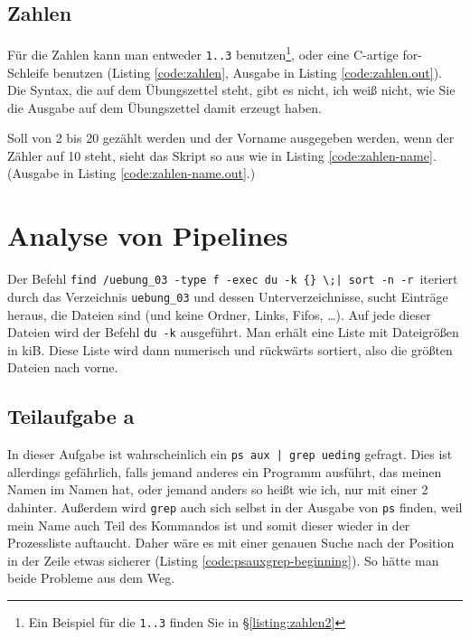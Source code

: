 {\subsection{Zahlen}

Für die Zahlen kann man entweder \texttt{{1..3}} benutzen\footnote{Ein Beispiel für die \texttt{{1..3}} finden Sie in §\ref{listing:zahlen2}}, oder eine C-artige for-Schleife benutzen (Listing \ref{code:zahlen}, Ausgabe in Listing \ref{code:zahlen.out}). Die Syntax, die auf dem Übungszettel steht, gibt es nicht, ich weiß nicht, wie Sie die Ausgabe auf dem Übungszettel damit erzeugt haben.


Soll von 2 bis 20 gezählt werden und der Vorname ausgegeben werden, wenn der Zähler auf 10 steht, sieht das Skript so aus wie in Listing \ref{code:zahlen-name}. (Ausgabe in Listing \ref{code:zahlen-name.out}.)


\section{Analyse von Pipelines}

Der Befehl \verb#find /uebung_03 -type f -exec du -k {} \;| sort -n -r#\ iteriert durch das Verzeichnis \verb#uebung_03# und dessen Unterverzeichnisse, sucht Einträge heraus, die Dateien sind (und keine Ordner, Links, Fifos, …). Auf jede dieser Dateien wird der Befehl \texttt{du -k} ausgeführt. Man erhält eine Liste mit Dateigrößen in kiB. Diese Liste wird dann numerisch und rückwärts sortiert, also die größten Dateien nach vorne.

\subsection{Teilaufgabe a}
In dieser Aufgabe ist wahrscheinlich ein \verb#ps aux | grep ueding# gefragt. Dies ist allerdings gefährlich, falls jemand anderes ein Programm ausführt, das meinen Namen im Namen hat, oder jemand anders so heißt wie ich, nur mit einer 2 dahinter. Außerdem wird \texttt{grep} auch sich selbst in der Ausgabe von \texttt{ps} finden, weil mein Name auch Teil des Kommandos ist und somit dieser wieder in der Prozessliste auftaucht. Daher wäre es mit einer genauen Suche nach der Position in der Zeile etwas sicherer (Listing \ref{code:psauxgrep-beginning}). So hätte man beide Probleme aus dem Weg.

}
